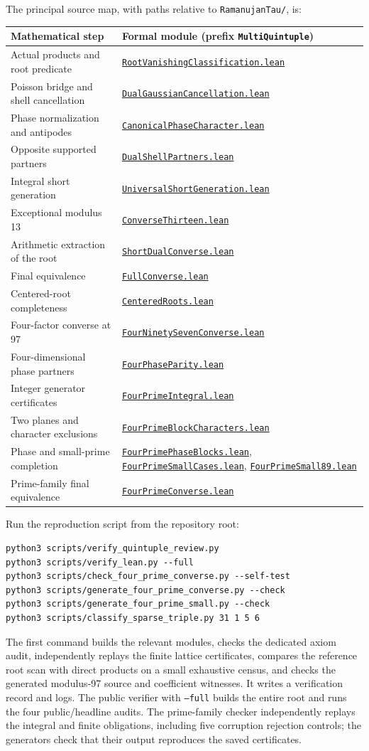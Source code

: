 \documentclass[11pt]{amsart}
\newcommand{\lean}[1]{{\small\nolinkurl{#1}}}
\newcommand{\src}[1]{\href{https://github.com/tomdif/RamanujanLean/blob/main/RamanujanTau/MultiQuintuple#1}{\lean{#1}}}
\theoremstyle{definition}
\begin{document}
The principal source map, with paths relative to \lean{RamanujanTau/}, is:
\begin{center}\small
\begin{tabular}{>{\raggedright\arraybackslash}p{}>{\raggedright\arraybackslash}p{}}
\toprule
Mathematical step & Formal module (prefix \lean{MultiQuintuple}) \\
\midrule
Actual products and root predicate & \src{RootVanishingClassification.lean} \\
Poisson bridge and shell cancellation & \src{DualGaussianCancellation.lean} \\
Phase normalization and antipodes & \src{CanonicalPhaseCharacter.lean} \\
Opposite supported partners & \src{DualShellPartners.lean} \\
Integral short generation & \src{UniversalShortGeneration.lean} \\
Exceptional modulus 13 & \src{ConverseThirteen.lean} \\
Arithmetic extraction of the root & \src{ShortDualConverse.lean} \\
Final equivalence & \src{FullConverse.lean} \\
Centered-root completeness & \src{CenteredRoots.lean} \\
Four-factor converse at 97 & \src{FourNinetySevenConverse.lean} \\
Four-dimensional phase partners & \src{FourPhaseParity.lean} \\
Integer generator certificates & \src{FourPrimeIntegral.lean} \\
Two planes and character exclusions & \src{FourPrimeBlockCharacters.lean} \\
Phase and small-prime completion & \src{FourPrimePhaseBlocks.lean}, \src{FourPrimeSmallCases.lean}, \src{FourPrimeSmall89.lean} \\
Prime-family final equivalence & \src{FourPrimeConverse.lean} \\
\bottomrule
\end{tabular}
\end{center}
Run the reproduction script from the repository root:
\begin{verbatim}
python3 scripts/verify_quintuple_review.py
python3 scripts/verify_lean.py --full
python3 scripts/check_four_prime_converse.py --self-test
python3 scripts/generate_four_prime_converse.py --check
python3 scripts/generate_four_prime_small.py --check
python3 scripts/classify_sparse_triple.py 31 1 5 6
\end{verbatim}
The first command builds the relevant modules, checks the dedicated axiom
audit, independently replays the finite lattice certificates, compares
the reference root scan with direct products on a small exhaustive census,
and checks the generated modulus-97 source and coefficient witnesses.
It writes a verification record and logs. The public verifier with
\texttt{--full} builds the entire root and runs the four public/headline
audits. The prime-family checker independently replays the integral and
finite obligations, including five corruption rejection controls; the
generators check that their output reproduces the saved certificates.
\end{document}
